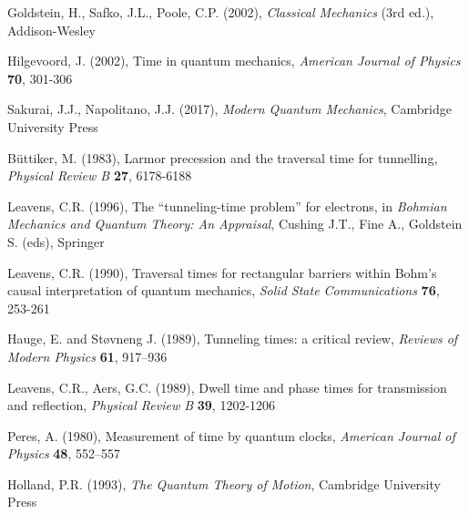 \documentclass{article}
\begin{document}
\clearpage

\begin{thebibliography}{100}
Goldstein, H., Safko, J.L., Poole, C.P. (2002), \textit{Classical Mechanics} (3rd ed.), Addison-Wesley

Hilgevoord, J. (2002), Time in quantum mechanics, \textit{American Journal of Physics} \textbf{70}, 301-306

Sakurai, J.J., Napolitano, J.J. (2017), \textit{Modern Quantum Mechanics}, Cambridge University Press

B{\"u}ttiker, M. (1983), Larmor precession and the traversal time for tunnelling, \textit{Physical Review B} \textbf{27}, 6178-6188

Leavens, C.R. (1996), The “tunneling-time problem” for electrons, in \textit{Bohmian Mechanics and Quantum Theory: An Appraisal}, Cushing J.T., Fine A., Goldstein S. (eds), Springer

Leavens, C.R. (1990), Traversal times for rectangular barriers within Bohm's causal interpretation of quantum mechanics, \textit{Solid State Communications} \textbf{76}, 253-261

Hauge, E. and St{\o}vneng J. (1989), Tunneling times: a critical review, \textit{Reviews of Modern Physics} \textbf{61}, 917–936

Leavens, C.R., Aers, G.C. (1989), Dwell time and phase times for transmission and reflection, \textit{Physical Review B} \textbf{39}, 1202-1206

Peres, A. (1980), Measurement of time by quantum clocks, \textit{American Journal of Physics} \textbf{48}, 552–557

Holland, P.R. (1993), \textit{The Quantum Theory of Motion}, Cambridge University Press



\end{thebibliography}
\end{document}
